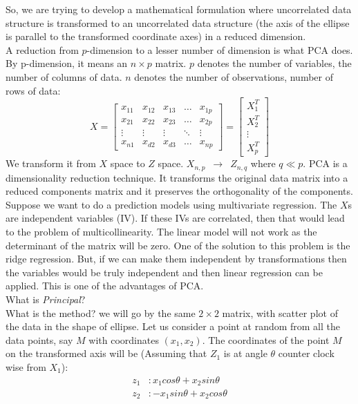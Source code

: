 \documentclass[12pt,a4paper]{report}
\begin{document}
So, we are trying to develop a mathematical formulation where uncorrelated data structure is transformed to an uncorrelated data structure (the axis of the ellipse is parallel to the transformed coordinate axes) in a reduced dimension. \\
A reduction from $p$-dimension to a lesser number of dimension is what PCA does. By p-dimension, it means an $n \times p$ matrix. $p$ denotes the number of variables, the number of columns of data. $n$ denotes the number of observations, number of rows of data:
\[
X
=
\begin{bmatrix}
    x_{11} & x_{12} & x_{13} & \dots  & x_{1p} \\
    x_{21} & x_{22} & x_{23} & \dots  & x_{2p} \\
    \vdots & \vdots & \vdots & \ddots & \vdots \\
    x_{n1} & x_{d2} & x_{d3} & \dots  & x_{np}
\end{bmatrix}
=
\begin{bmatrix}
    X_{1}^T \\
    X_{2}^T \\
    \vdots \\
    X_{p}^T 
\end{bmatrix}

\]
We transform it from $X$ space to $Z$ space.
$X_{n,p}$ $\,\to\,$ $Z_{n,q}$ where $q \ll p$. PCA is a dimensionality reduction technique. It transforms the original data matrix into a reduced components matrix and it preserves the orthogonality of the components. Suppose we want to do a prediction models using multivariate regression. The $X$s are independent variables (IV). If these IVs are correlated, then that would lead to the problem of multicollinearity. The linear model will not work as the determinant of the matrix will be zero. One of the solution to this problem is the ridge regression. But, if we can make them independent by transformations then the variables would be truly independent and then linear regression can be applied. This is one of the advantages of PCA.\\
What is \textit{Principal}? \\
What is the method? we will go by the same $2 \times 2$ matrix, with scatter plot of the data in the shape of ellipse. Let us consider a point at random from all the data points, say $M$ with coordinates $(x_1,x_2)$. The coordinates of the point $M$ on the transformed axis will be (Assuming that $Z_1$ is at angle $\theta$ counter clock wise from $X_1$):
\begin{align}
z_1 &: x_1 cos \theta + x_2 sin \theta \\
z_2 &: -x_1 sin \theta + x_2 cos \theta 
\end{align}
\end{document}

